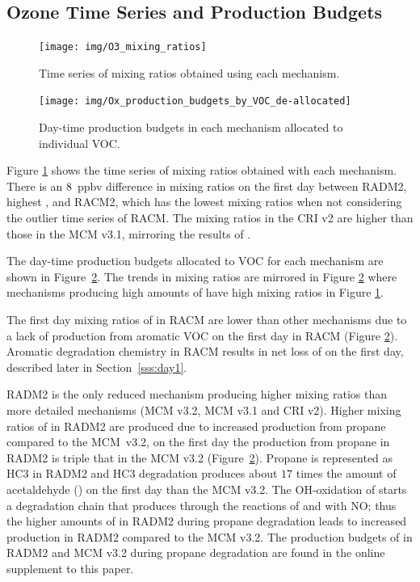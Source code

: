 %
\subsection[O3 Time Series and Ox Production Budgets]{Ozone Time Series and  Production Budgets} \label{ss:O3_time_series}
%
\begin{figure}
    \centering
    \texttt{[image: img/O3\_mixing\_ratios]}
    \vspace{0mm}
    \caption{Time series of  mixing ratios obtained using each mechanism.}
    \vspace{-4mm}
    \label{f:time_series}
\end{figure}
%
\begin{figure}
    \centering
    \texttt{[image: img/Ox\_production\_budgets\_by\_VOC\_de-allocated]}
    \vspace{1mm}
    \caption{Day-time  production budgets in each mechanism allocated to individual VOC.}
    \vspace{-4mm}
    \label{f:Ox_tagged_budgets}
\end{figure}
%
Figure \ref{f:time_series} shows the time series of  mixing ratios obtained with each mechanism.
There is an \mbox{$8$ ppbv} difference in  mixing ratios on the first day between RADM2, highest , and RACM2, which has the lowest  mixing ratios when not considering the outlier time series of RACM.
The  mixing ratios in the CRI v2 are higher than those in the MCM v3.1, mirroring the results of \citet{Jenkin:2008}.

The day-time  production budgets allocated to VOC for each mechanism are shown in \mbox{Figure \ref{f:Ox_tagged_budgets}}.
The trends in  mixing ratios are mirrored in Figure \ref{f:Ox_tagged_budgets} where mechanisms producing high amounts of  have high  mixing ratios in Figure \ref{f:time_series}.

The first day mixing ratios of  in RACM are lower than other mechanisms due to a lack of  production from aromatic VOC on the first day in RACM (Figure \ref{f:Ox_tagged_budgets}).
Aromatic degradation chemistry in RACM results in net loss of  on the first day, described later in \mbox{Section \ref{sss:day1}}.

RADM2 is the only reduced mechanism producing higher  mixing ratios than more detailed mechanisms (MCM v3.2, MCM v3.1 and CRI v2).
Higher mixing ratios of  in RADM2 are produced due to increased  production from propane compared to the \mbox{MCM v3.2}, on the first day the  production from propane in RADM2 is triple that in the MCM v3.2 \mbox{(Figure \ref{f:Ox_tagged_budgets})}.
Propane is represented as HC3 in RADM2 \citep{Stockwell:1990} and HC3 degradation produces about $17$ times the amount of acetaldehyde () on the first day than the MCM v3.2.
The OH-oxidation of  starts a degradation chain that produces  through the reactions of  and  with NO; thus the higher amounts of  in RADM2 during propane degradation leads to increased  production in RADM2 compared to the MCM v3.2.
The production budgets of  in RADM2 and MCM v3.2 during propane degradation are found in the online supplement to this paper.
%

